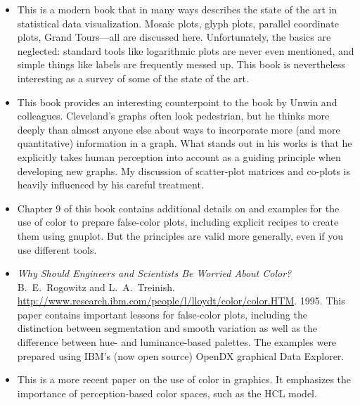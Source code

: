 \begin{itemize}

\item {} 
  This is a modern book that in many ways describes the state of the
  art in statistical data visualization. Mosaic plots, glyph plots,
  parallel coordinate plots, Grand Tours---all are discussed here.
  Unfortunately, the basics are neglected: standard tools like
  logarithmic plots are never even mentioned, and simple things like
  labels are frequently messed up.  This book is nevertheless
  interesting as a survey of some of the state of the art.

\item {} 
  This book provides an interesting counterpoint to the book by Unwin
  and colleagues. Cleveland's graphs often look pedestrian, but he
  thinks more deeply than almost anyone else about ways to incorporate
  more (and more quantitative) information in a graph. What stands out
  in his works is that he explicitly takes human perception into
  account as a guiding principle when developing new graphs. My
  discussion of scatter-plot matrices and co-plots is heavily
  influenced by his careful treatment.

\item {}
  Chapter 9 of this book contains additional details on and examples
  for the use of color to prepare false-color plots, including
  explicit recipes to create them using gnuplot. But the principles
  are valid more generally, even if you use different tools.

\item 
{\it Why Should Engineers and Scientists Be Worried About
    Color?} {B.\ E.\ Rogowitz and L.\ A.\
    Treinish.} {\url{http://www.research.ibm.com/people/l/lloydt/color/color.HTM}.} {1995.}
  This paper contains important lessons for false-color plots,
  including the distinction between segmentation and smooth variation
  as well as the difference between hue- and luminance-based palettes.
  The examples were prepared using IBM's (now open source) OpenDX
  graphical Data Explorer.

\item {}
  This is a more recent paper on the use of color in graphics. It
  emphasizes the importance of perception-based color spaces, such as
  the HCL model.
\end{itemize}


\clearpage

\thispagestyle{empty}

\cleardoublepage